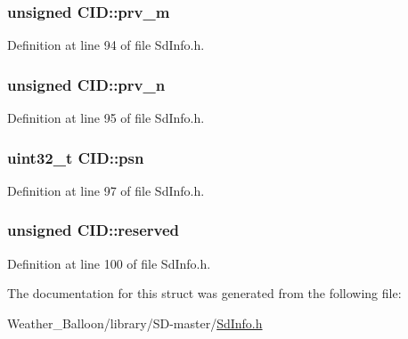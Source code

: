 \subsubsection[{\texorpdfstring{prv\+\_\+m}{prv\_m}}]{\setlength{\rightskip}{0pt plus 5cm}unsigned C\+I\+D\+::prv\+\_\+m}\hypertarget{struct_c_i_d_a7735b6ae8914c4731de30de32c0ac75c}{}\label{struct_c_i_d_a7735b6ae8914c4731de30de32c0ac75c}


Definition at line 94 of file Sd\+Info.\+h.

\subsubsection[{\texorpdfstring{prv\+\_\+n}{prv\_n}}]{\setlength{\rightskip}{0pt plus 5cm}unsigned C\+I\+D\+::prv\+\_\+n}\hypertarget{struct_c_i_d_a15237f61edb06b3b6dd25b8c1f15280a}{}\label{struct_c_i_d_a15237f61edb06b3b6dd25b8c1f15280a}


Definition at line 95 of file Sd\+Info.\+h.

\subsubsection[{\texorpdfstring{psn}{psn}}]{\setlength{\rightskip}{0pt plus 5cm}uint32\+\_\+t C\+I\+D\+::psn}\hypertarget{struct_c_i_d_ada215f8541fa46078461d8da9574fc5e}{}\label{struct_c_i_d_ada215f8541fa46078461d8da9574fc5e}


Definition at line 97 of file Sd\+Info.\+h.

\subsubsection[{\texorpdfstring{reserved}{reserved}}]{\setlength{\rightskip}{0pt plus 5cm}unsigned C\+I\+D\+::reserved}\hypertarget{struct_c_i_d_a458794d915efa88aef06f5b0612895ac}{}\label{struct_c_i_d_a458794d915efa88aef06f5b0612895ac}


Definition at line 100 of file Sd\+Info.\+h.



The documentation for this struct was generated from the following file\+:\begin{DoxyCompactItemize}
\item 
Weather\+\_\+\+Balloon/library/\+S\+D-\/master/\hyperlink{_sd_info_8h}{Sd\+Info.\+h}\end{DoxyCompactItemize}
